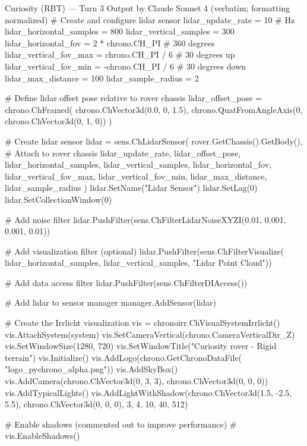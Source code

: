 \begin{CodeBlock}[breakable]{Curiosity (RBT) --- Turn 3 Output by Claude Sonnet 4 (verbatim; formatting normalized)}
      # Create and configure lidar sensor
      lidar_update_rate = 10  # Hz
      lidar_horizontal_samples = 800
      lidar_vertical_samples = 300
      lidar_horizontal_fov = 2 * chrono.CH_PI  # 360 degrees
      lidar_vertical_fov_max = chrono.CH_PI / 6  # 30 degrees up
      lidar_vertical_fov_min = -chrono.CH_PI / 6  # 30 degrees down
      lidar_max_distance = 100
      lidar_sample_radius = 2
      
      # Define lidar offset pose relative to rover chassis
      lidar_offset_pose = chrono.ChFramed(
          chrono.ChVector3d(0.0, 0, 1.5), chrono.QuatFromAngleAxis(0, chrono.ChVector3d(0, 1, 0))
      )
      
      # Create lidar sensor
      lidar = sens.ChLidarSensor(
          rover.GetChassis().GetBody(),  # Attach to rover chassis
          lidar_update_rate,
          lidar_offset_pose,
          lidar_horizontal_samples,
          lidar_vertical_samples,
          lidar_horizontal_fov,
          lidar_vertical_fov_max,
          lidar_vertical_fov_min,
          lidar_max_distance,
          lidar_sample_radius
      )
      lidar.SetName("Lidar Sensor")
      lidar.SetLag(0)
      lidar.SetCollectionWindow(0)
      
      # Add noise filter
      lidar.PushFilter(sens.ChFilterLidarNoiseXYZI(0.01, 0.001, 0.001, 0.01))
      
      # Add visualization filter (optional)
      lidar.PushFilter(sens.ChFilterVisualize(
        lidar_horizontal_samples, lidar_vertical_samples, "Lidar Point Cloud"))
      
      # Add data access filter
      lidar.PushFilter(sens.ChFilterDIAccess())
      
      # Add lidar to sensor manager
      manager.AddSensor(lidar)
      
      # Create the Irrlicht visualization
      vis = chronoirr.ChVisualSystemIrrlicht()
      vis.AttachSystem(system)
      vis.SetCameraVertical(chrono.CameraVerticalDir_Z)
      vis.SetWindowSize(1280, 720)
      vis.SetWindowTitle("Curiosity rover - Rigid terrain")
      vis.Initialize()
      vis.AddLogo(chrono.GetChronoDataFile(
      "logo_pychrono_alpha.png"))
      vis.AddSkyBox()
      vis.AddCamera(chrono.ChVector3d(0, 3, 3), chrono.ChVector3d(0, 0, 0))
      vis.AddTypicalLights()
      vis.AddLightWithShadow(chrono.ChVector3d(1.5, -2.5, 5.5), chrono.ChVector3d(0, 0, 0), 3, 4, 10, 40, 512)
      
      # Enable shadows (commented out to improve performance)
      # vis.EnableShadows()
      

\end{CodeBlock}
